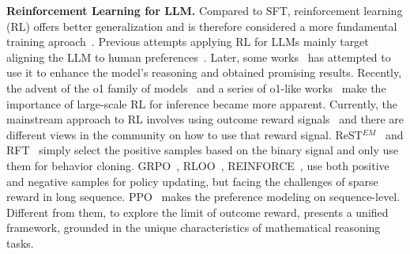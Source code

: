 \noindent\textbf{Reinforcement Learning for LLM.}
Compared to SFT, reinforcement learning (RL) offers better generalization and is therefore considered a more fundamental training aproach~\cite{chu2025sft}. 
Previous attempts applying RL for LLMs mainly target aligning the LLM to human preferences~\cite{ouyang2022training}.
Later, some works~\cite{ying2024internlm, shao2024deepseekmath, luo2023wizardmath, lightman2023let} has attempted to use it to enhance the model's reasoning and obtained promising results.
Recently, the advent of the o1 family of models~\cite{openai2024learning} and a series of o1-like works~\cite{deepseekr1, zeng2025simplerl, cui2025process, guan2025rstar} make the importance of large-scale RL for inference became more apparent. 
Currently, the mainstream approach to RL involves using outcome reward signals~\cite{deepseekr1, zeng2025simplerl, kazemnejad2024vineppo} and there are different views in the community on how to use that reward signal.
ReST$^{EM}$~\cite{singh2023beyond} and RFT~\cite{yuan2023scaling} simply select the positive samples based on the binary signal and only use them for behavior cloning.
GRPO~\cite{shao2024deepseekmath}, RLOO~\cite{fukunaga1989leave, ahmadian2024back}, REINFORCE~\cite{sutton1999policy}, use both positive and negative samples for policy updating, but facing the challenges of sparse reward in long sequence.
PPO~\cite{schulman2017proximal} makes the preference modeling on sequence-level.
Different from them, to explore the limit of outcome reward, \methodname{} presents a unified framework, grounded in the unique characteristics of mathematical reasoning tasks.